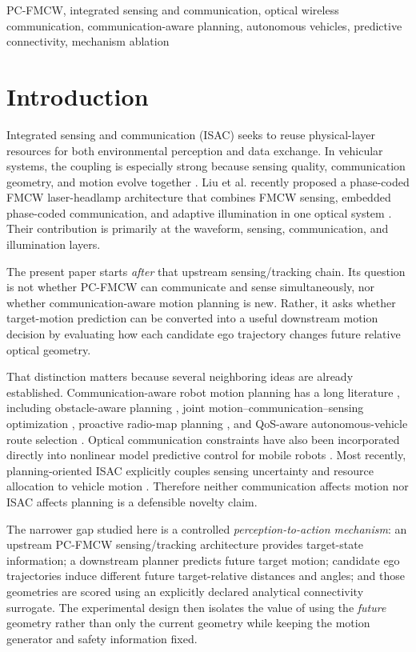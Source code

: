 \documentclass[journal]{IEEEtran}
\begin{document}
\begin{IEEEkeywords}
PC-FMCW, integrated sensing and communication, optical wireless communication, communication-aware planning, autonomous vehicles, predictive connectivity, mechanism ablation
\end{IEEEkeywords}

\section{Introduction}
Integrated sensing and communication (ISAC) seeks to reuse physical-layer resources for both environmental perception and data exchange. In vehicular systems, the coupling is especially strong because sensing quality, communication geometry, and motion evolve together \cite{cheng2022}. Liu et al. recently proposed a phase-coded FMCW laser-headlamp architecture that combines FMCW sensing, embedded phase-coded communication, and adaptive illumination in one optical system \cite{liu2026}. Their contribution is primarily at the waveform, sensing, communication, and illumination layers.

The present paper starts \emph{after} that upstream sensing/tracking chain. Its question is not whether PC-FMCW can communicate and sense simultaneously, nor whether communication-aware motion planning is new. Rather, it asks whether target-motion prediction can be converted into a useful downstream motion decision by evaluating how each candidate ego trajectory changes future relative optical geometry.

That distinction matters because several neighboring ideas are already established. Communication-aware robot motion planning has a long literature \cite{ghaffarkhah2011,muralidharan2021}, including obstacle-aware planning \cite{hurst2021}, joint motion--communication--sensing optimization \cite{cai2022}, proactive radio-map planning \cite{gordon2026}, and QoS-aware autonomous-vehicle route selection \cite{ullah2025}. Optical communication constraints have also been incorporated directly into nonlinear model predictive control for mobile robots \cite{silano2025}. Most recently, planning-oriented ISAC explicitly couples sensing uncertainty and resource allocation to vehicle motion \cite{jin2026}. Therefore neither communication affects motion nor ISAC affects planning is a defensible novelty claim.

The narrower gap studied here is a controlled \emph{perception-to-action mechanism}: an upstream PC-FMCW sensing/tracking architecture provides target-state information; a downstream planner predicts future target motion; candidate ego trajectories induce different future target-relative distances and angles; and those geometries are scored using an explicitly declared analytical connectivity surrogate. The experimental design then isolates the value of using the \emph{future} geometry rather than only the current geometry while keeping the motion generator and safety information fixed.
\end{document}
